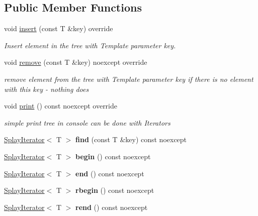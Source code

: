 \subsection*{Public Member Functions}
\begin{DoxyCompactItemize}
\item 
\mbox{\label{classSplayTree_a855f0e55be8ad7d01f5b0330ee0025b0}} 
void \hyperlink{classSplayTree_a855f0e55be8ad7d01f5b0330ee0025b0}{insert} (const T \&key) override
\begin{DoxyCompactList}\small\item\em Insert element in the tree with Template parameter key. \end{DoxyCompactList}\item 
\mbox{\label{classSplayTree_a5bdc3f8e97386b08e9526f4f93def2cf}} 
void \hyperlink{classSplayTree_a5bdc3f8e97386b08e9526f4f93def2cf}{remove} (const T \&key) noexcept override
\begin{DoxyCompactList}\small\item\em remove element from the tree with Template parameter key  if there is no element with this key -\/ nothing does \end{DoxyCompactList}\item 
\mbox{\label{classSplayTree_a5299790551c2576d621ebc47f47f413d}} 
void \hyperlink{classSplayTree_a5299790551c2576d621ebc47f47f413d}{print} () const noexcept override
\begin{DoxyCompactList}\small\item\em simple print tree in console  can be done with Iterators \end{DoxyCompactList}\item 
\mbox{\label{classSplayTree_a97b654c8ebfb8e780dc4a46fb1e1197a}} 
\hyperlink{classSplayIterator}{Splay\+Iterator}$<$ T $>$ {\bfseries find} (const T \&key) const noexcept
\item 
\mbox{\label{classSplayTree_afb4da5395fe3815703b7741e92b50fdd}} 
\hyperlink{classSplayIterator}{Splay\+Iterator}$<$ T $>$ {\bfseries begin} () const noexcept
\item 
\mbox{\label{classSplayTree_a9aff68b59f341ff1a9455101836d9e44}} 
\hyperlink{classSplayIterator}{Splay\+Iterator}$<$ T $>$ {\bfseries end} () const noexcept
\item 
\mbox{\label{classSplayTree_a073db12fe9a7269cf09c284a5960d0e0}} 
\hyperlink{classSplayIterator}{Splay\+Iterator}$<$ T $>$ {\bfseries rbegin} () const noexcept
\item 
\mbox{\label{classSplayTree_aeab592029a72feadab4b848ebc7e3665}} 
\hyperlink{classSplayIterator}{Splay\+Iterator}$<$ T $>$ {\bfseries rend} () const noexcept
\end{DoxyCompactItemize}
